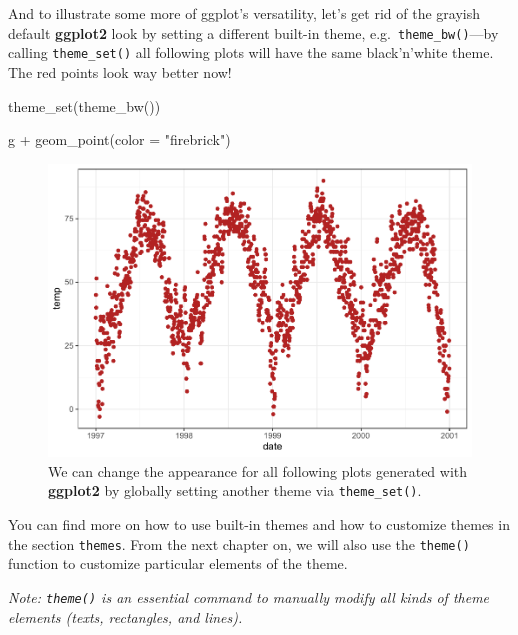 \documentclass[
]{krantz}
\makeatletter
\newenvironment{Shaded}{\begin{snugshade}}{\end{snugshade}}
\newcommand{\AttributeTok}[1]{\textcolor[rgb]{0.61,0.61,0.61}{#1}}
\newcommand{\FunctionTok}[1]{\textcolor[rgb]{0,0,0}{#1}}
\newcommand{\NormalTok}[1]{#1}
\newcommand{\SpecialCharTok}[1]{\textcolor[rgb]{0,0,0}{#1}}
\newcommand{\StringTok}[1]{\textcolor[rgb]{0.5,0.5,0.5}{#1}}
\newenvironment{kframe}{%
\medskip{}
\setlength{\fboxsep}{.8em}
 \def\at@end@of@kframe{}%
 \ifinner\ifhmode%
  \def\at@end@of@kframe{\end{minipage}}%
  \begin{minipage}{\columnwidth}%
 \fi\fi%
 \def\FrameCommand##1{\hskip\@totalleftmargin \hskip-\fboxsep
 \colorbox{shadecolor}{##1}\hskip-\fboxsep
     \hskip-\linewidth \hskip-\@totalleftmargin \hskip\columnwidth}%
 \MakeFramed {\advance\hsize-\width
   \@totalleftmargin\z@ \linewidth\hsize
   \@setminipage}}%
 {\par\unskip\endMakeFramed%
 \at@end@of@kframe}
\renewenvironment{Shaded}{\begin{kframe}}{\end{kframe}}
\makeatother
\begin{document}
And to illustrate some more of ggplot's versatility, let's get rid of the grayish default \textbf{ggplot2} look by setting a different built-in theme, e.g.~\texttt{theme\_bw()}---by calling \texttt{theme\_set()} all following plots will have the same black'n'white theme. The red points look way better now!

\begin{Shaded}
\begin{Highlighting}[]
\FunctionTok{theme\_set}\NormalTok{(}\FunctionTok{theme\_bw}\NormalTok{())}

\NormalTok{g }\SpecialCharTok{+} \FunctionTok{geom\_point}\NormalTok{(}\AttributeTok{color =} \StringTok{"firebrick"}\NormalTok{)}
\end{Highlighting}
\end{Shaded}

\begin{figure}
\centering
\includegraphics{bookdown_files/figure-latex/remove-gray-background-1.pdf}
\caption{\label{fig:remove-gray-background}We can change the appearance for all following plots generated with \textbf{ggplot2} by globally setting another theme via \texttt{theme\_set()}.}
\end{figure}

You can find more on how to use built-in themes and how to customize themes in the section \texttt{themes}. From the next chapter on, we will also use the \texttt{theme()} function to customize particular elements of the theme.

\emph{Note: \texttt{theme()} is an essential command to manually modify all kinds of theme elements (texts, rectangles, and lines).}
\end{document}
